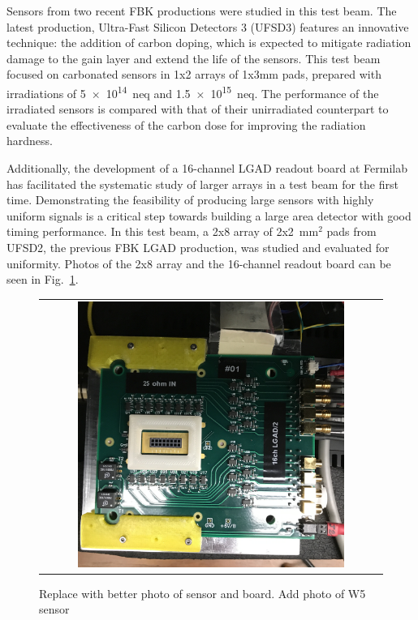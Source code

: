 \documentclass[preprint,1p]{elsarticle}
\begin{document}

Sensors from two recent FBK productions were studied in this test beam. The latest production, Ultra-Fast Silicon Detectors 3 (UFSD3) features an innovative technique: the addition of carbon doping, which is expected to mitigate radiation damage to the gain layer and extend the life of the sensors.
This test beam focused on carbonated sensors in 1x2 arrays of 1x3mm pads, prepared with irradiations of \num{5e14}~neq and \num{1.5e15}~neq. The performance of the irradiated sensors is compared with that of their unirradiated counterpart to evaluate the effectiveness of the carbon dose for improving the radiation hardness.

Additionally, the development of a 16-channel LGAD readout board at Fermilab has facilitated the systematic study of larger arrays in a test beam for the first time. Demonstrating the feasibility of producing large sensors with highly uniform signals is a critical step towards building a large area detector with good timing performance. In this test beam, a 2x8 array of 2x2~mm$^{2}$ pads from UFSD2, the previous FBK LGAD production, was studied and evaluated for uniformity. Photos of the 2x8 array and the 16-channel readout board can be seen in Fig.~\ref{fig:array_photo}.


\begin{figure}[htp] 
\centering 
\begin{tabular}{c} 
\includegraphics[width=0.8\textwidth]{fig/arrayphoto}   

\end{tabular} 
\caption{Replace with better photo of sensor and board. Add photo of W5 sensor}
\label{fig:array_photo} 
\end{figure} 
\end{document}

